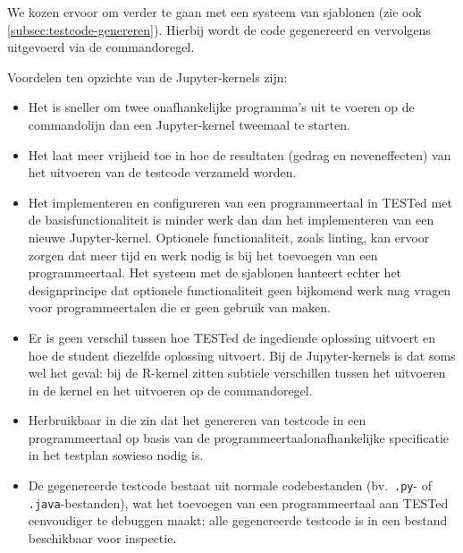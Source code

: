 We kozen ervoor om verder te gaan met een systeem van sjablonen (zie ook \cref{subsec:testcode-genereren}).
Hierbij wordt de code gegenereerd en vervolgens uitgevoerd via de commandoregel.

Voordelen ten opzichte van de Jupyter-kernels zijn:
\begin{itemize}
    \item Het is sneller om twee onafhankelijke programma's uit te voeren op de commandolijn dan een Jupyter-kernel tweemaal te starten.
    \item Het laat meer vrijheid toe in hoe de resultaten (gedrag en neveneffecten) van het uitvoeren van de testcode verzameld worden.
    \item Het implementeren en configureren van een programmeertaal in TESTed met de basisfunctionaliteit is minder werk dan dan het implementeren van een nieuwe Jupyter-kernel.
    Optionele functionaliteit, zoals linting, kan ervoor zorgen dat meer tijd en werk nodig is bij het toevoegen van een programmeertaal.
    Het systeem met de sjablonen hanteert echter het designprincipe dat optionele functionaliteit geen bijkomend werk mag vragen voor programmeertalen die er geen gebruik van maken.
    \item Er is geen verschil tussen hoe TESTed de ingediende oplossing uitvoert en hoe de student diezelfde oplossing uitvoert.
    Bij de Jupyter-kernels is dat soms wel het geval: bij de R-kernel zitten subtiele verschillen tussen het uitvoeren in de kernel en het uitvoeren op de commandoregel.
    \item Herbruikbaar in die zin dat het genereren van testcode in een programmeertaal op basis van de programmeertaalonafhankelijke specificatie in het testplan sowieso nodig is.
    \item De gegenereerde testcode bestaat uit normale codebestanden (bv.\ \texttt{.py}- of \texttt{.java}-bestanden), wat het toevoegen van een programmeertaal aan TESTed eenvoudiger te debuggen maakt: alle gegenereerde testcode is in een bestand beschikbaar voor inspectie.
\end{itemize}

